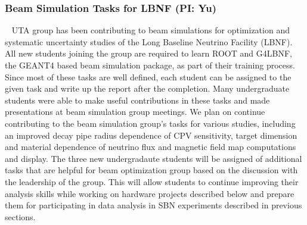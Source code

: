 %
%
\subsubsection {Beam Simulation Tasks for LBNF (PI: Yu)}~\label{sec:dune-beam-sim}
UTA group has been contributing to beam simulations for optimization and systematic uncertainty studies of the Long Baseline Neutrino Facility (LBNF). All new students joining the group are required to learn ROOT and G4LBNF, the GEANT4 based beam simulation package, as part of their training process.  Since most of these tasks are well defined, each student can be assigned to the given task and write up the report after the completion. Many undergraduate students were able to make useful contributions in these tasks and made presentations at beam simulation group meetings.  We plan on continue contributing to the beam simulation group's tasks for various studies, including an improved decay pipe radius dependence of CPV sensitivity, target dimension and material dependence of neutrino flux and magnetic field map computations and display. The three new undergradaute students will be assigned of additional tasks that are helpful for beam optimization group based on the discussion with the leadership of the group.  This will allow students to continue improving their analysis skills while working on hardware projects described below and prepare them for participating in data analysis in SBN experiments described in previous sections.
